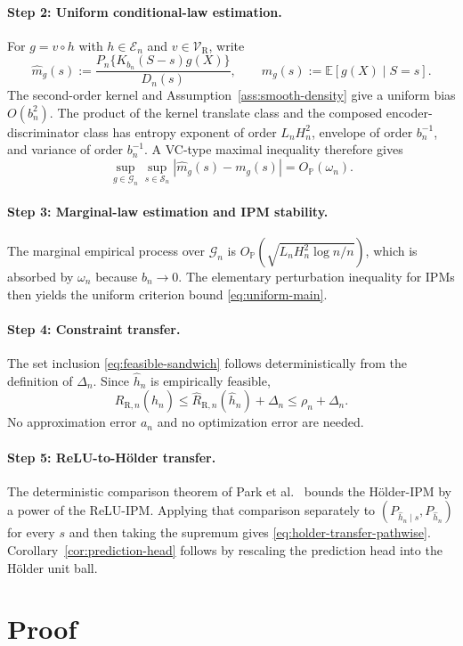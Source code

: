 \documentclass[11pt]{article}
\theoremstyle{remark}
\newcommand{\E}{\mathbb{E}}
\newcommand{\Pp}{\mathbb{P}}
\newcommand{\cS}{\mathcal{S}}
\newcommand{\cV}{\mathcal{V}}
\newcommand{\cG}{\mathcal{G}}
\newcommand{\cE}{\mathscr{E}}
\newcommand{\wh}{\widehat}
\begin{document}
\paragraph{Step 2: Uniform conditional-law estimation.}
For $g=v\circ h$ with $h\in\cE_n$ and $v\in\cV_{\mathrm{R}}$, write
\[
  \wh m_g(s)
  :=
  \frac{P_n\{K_{b_n}(S-s)g(X)\}}{D_n(s)},
  \qquad
  m_g(s):=\E[g(X)\mid S=s].
\]
The second-order kernel and Assumption~\ref{ass:smooth-density} give a uniform
bias $O(b_n^2)$.  The product of the kernel translate class and the composed
encoder-discriminator class has entropy exponent of order $L_nH_n^2$, envelope
of order $b_n^{-1}$, and variance of order $b_n^{-1}$.  A VC-type maximal
inequality therefore gives
\[
  \sup_{g\in\cG_n}\sup_{s\in\cS_n}
  |\wh m_g(s)-m_g(s)|
  =O_{\Pp}(\omega_n).
\]

\paragraph{Step 3: Marginal-law estimation and IPM stability.}
The marginal empirical process over $\cG_n$ is
$O_{\Pp}(\sqrt{L_nH_n^2\log n/n})$, which is absorbed by $\omega_n$ because
$b_n\to0$.  The elementary perturbation inequality for IPMs then yields the
uniform criterion bound \eqref{eq:uniform-main}.

\paragraph{Step 4: Constraint transfer.}
The set inclusion \eqref{eq:feasible-sandwich} follows deterministically from
the definition of $\Delta_n$.  Since $\wh h_n$ is empirically feasible,
\[
  R_{\mathrm{R},n}(\wh h_n)
  \le
  \wh R_{\mathrm{R},n}(\wh h_n)+\Delta_n
  \le
  \rho_n+\Delta_n.
\]
No approximation error $a_n$ and no optimization error are needed.

\paragraph{Step 5: ReLU-to-H\"older transfer.}
The deterministic comparison theorem of Park et al.~\cite{park2025relu} bounds
the H\"older-IPM by a power of the ReLU-IPM.  Applying that comparison separately
to $(P_{\wh h_n\mid s},P_{\wh h_n})$ for every $s$ and then taking the supremum
gives \eqref{eq:holder-transfer-pathwise}.  Corollary~\ref{cor:prediction-head}
follows by rescaling the prediction head into the H\"older unit ball.

\section{Proof}
\end{document}
